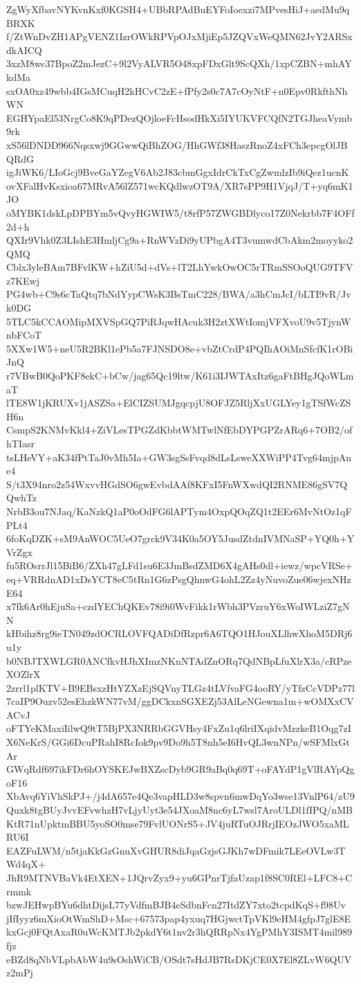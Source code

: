 ZgWyXfbavNYKvnKxf0KGSH4+UBbRPAdBuEYFoIoexzi7MPvesHiJ+aedMu9qBRXK
f/ZtWnDvZH1APgVENZ1IzrOWkRPVpOJxMjiEp5JZQVxWeQMN62JvY2ARSxdkAICQ
3xzM8wc37BpoZ2mJezC+9l2VyALVR5O48xpFDxGlt9ScQXh/1xpCZBN+mhAYkdMa
sxOA0xz49wbb4IGsMCuqH2kHCvC2zE+fPfy2s0c7A7cOyNtF+n0Epv0RkfthNhWN
EGHYpaEl53NrgCo8K9qPDezQOjloeFcHsodHkXi5IYUKVFCQfN2TGJheaVymb9rk
xS56lDNDD966Nqsxwj9GGwwQiBhZOG/HhGWf38HaszRnoZ4xFCh3epcgOlJBQRdG
igJiWK6/LIoGcj9BveGaYZegV6Ab2J83cbmGgxIdrCkTxCgZwmlzIb9iQez1ucnK
ovXFalHvKsxioa67MRvA56lZ571wcKQdlwzOT9A/XR7sPP9H1VjqJ/T+yq6mK1JO
oMYBK1dskLpDPBYm5vQvyHGWIW5/t8rfP57ZWGBDlyco17Z0Nekrbb7F4OFf2d+h
QXIr9Vhk0Z3LIshE3HmljCg9a+RnWVzDi9yUPbgA4T3vumwdCbAkm2moyyko2QMQ
Cblx3yleBAm7BFvlKW+hZiU5d+dVs+lT2LhYwkOwOC5rTRmSSOoQUG9TFVz7KEwj
PG4wb+C9s6cTaQtq7bNdYypCWsK3BsTmC228/BWA/a3hCmJcI/bLTI9vR/Jvk0DG
5TLC5kCCAOMipMXVSpGQ7PiRJqwHAcuk3H2ztXWtIomjVFXvoU9v5TjynWnbFCoT
5XXw1W5+neU5R2BKl1ePb5a7FJNSDO8e+vbZtCrdP4PQIhAOiMnSfcfK1rOBiJnQ
r7VBwB0QoPKF8ekC+bCw/jag65Qc19ltw/K61i3IJWTAxItz6gaFtBHgJQoWLmaT
lTE8W1jKRUXv1jASZSa+ElCIZSUMJgqcpjU8OFJZ5RljXxUGLYey1gTSfWcZSH6n
CsmpS2KNMvKkl4+ZiVLesTPGZdKbbtWMTwlNfEbDYPGPZrARq6+7OB2/ofhTIasr
tsLHeVY+aK34fPtTaJ0vMh5Ia+GW3sgSsFvqd8dLsLsweXXWiPP4Tvg64mjpAne4
S/t3X94nro2z54WxvvHGdSO6gwEvbdAAf8KFxI5FnWXwdQI2RNME86gSV7QQwhTz
NrbB3ou7NJaq/KaNzkQ1aP0oOdFG6lAPTym4OxpQOqZQ1t2EEr6MvNtOz1qFPLt4
6foKqDZK+sM9AnWOC5UeO7grck9V34K0a5OY5JusdZtdnIVMNaSP+YQ0h+YVrZgx
fu5ROsrrJl15BiB6/ZXh47gLFd1su6E3JmBsdZMD6X4gAHs0dl+iewz/wpcVRSe+
eq+VRRdnAD1xDsYCT8eC5tRn1G6zPsgQhnwG4ohL2Zz4yNuvoZue06wjexNHzE64
x7fk6Ar0hEjuSa+czdYEChQKEv78i9i0WvFikk1rWbh3PVzruY6xWoIWLziZ7gNN
kHbihz8rg9ieTN049zdOCRLOVFQADiDfRzpr6A6TQO1HJouXLlhwXhoM5DRj6u1y
b0NBJTXWLGR0ANCfkvHJhXImzNKnNTAdZnORq7QdNBpLfuXlrX3a/cRPzeXOZlrX
2zrrl1plKTV+B9EBsxzHtYZXzEjSQVnyTLGz4tLVfvaFG4ooRY/yTfzCcVDPz77l
7caIP9Ouzv52esEhzkWN77vM/ggDCkxnSGXEZj53AlLeNGewna1m+wOMXxCVACvJ
oFTYeKMaxiIilwQ9tT5BjPX3NRRbGGVHsy4FxZu1q6lriIXqidvMzzkeB1Oqg7zI
X6NeKrS/GGi6DcuPRahI8RcIok9pv9Do9h5T8nh5eI6HvQL3wnNPn/wSFMlxGtAr
GWqRdf697ikFDr6hOYSKEJwBXZscDyb9GR9aBq0q69T+oFAYdP1gVlRAYpQgoF16
XbAvq6YiVhSkPJ+/j4dA657e4Qe3vapHLD3w8spvn6mwDqYo3wse13VnlP64/zU9
Quxk8tgBUyJvvEFvwhzH7vLjyUyt3e54JXoaM8nc6yL7wsl7AroULDl1fIPQ/nMB
KtR71nUpktmBBU5yoSO0mse79FvlUONrS5+JV4juRTuOJRrjIEOzJWO5xaMLRU6I
EAZFuLWM/n5tjaKkGzGnuXvGHUR8diJqaGzjsGJKh7wDFmik7LEeOVLw3TWd4qX+
JhR9MTNVBaVk4EtXEN+1JQrvZyx9+yu6GPnrTjfaUzap1f8SC0REl+LFC8+Crmmk
bzwJEHwpBYu6dhtDijsL77yVdfmBJB4eSdbnFcn27ItdZY7xto2tcpdKqS+f98Uv
jIfIyyz6mXioOtWmShD+Msc+67573pap4yxuq7HGjwctTpVKl9eHM4gfpJ7glE8E
kxGcj0FQtAxaR0uWcKMTJb2pkdY6t1nv2r3hQRRpNx4YgPMhY3ISMT4mil989fjz
eBZd8qNbVLpbAbW4u9sOshWiCB/OSdt7sHdJB7RsDKjCE0X7El8ZLvW6QUVz2mPj
